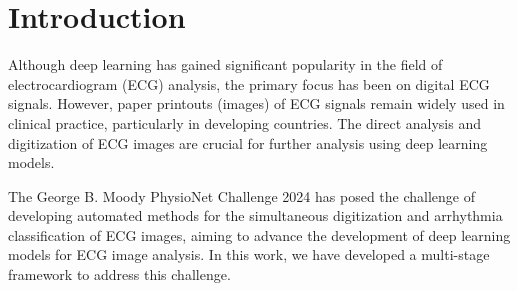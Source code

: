 \section{Introduction}
\label{sec:intro}


Although deep learning has gained significant popularity in the field of electrocardiogram (ECG) analysis, the primary focus has been on digital ECG signals. However, paper printouts (images) of ECG signals remain widely used in clinical practice, particularly in developing countries. The direct analysis and digitization of ECG images are crucial for further analysis using deep learning models.

The George B. Moody PhysioNet Challenge 2024 \cite{goldberger2000physionet, cinc2024} has posed the challenge of developing automated methods for the simultaneous digitization and arrhythmia classification of ECG images, aiming to advance the development of deep learning models for ECG image analysis. In this work, we have developed a multi-stage framework to address this challenge.
